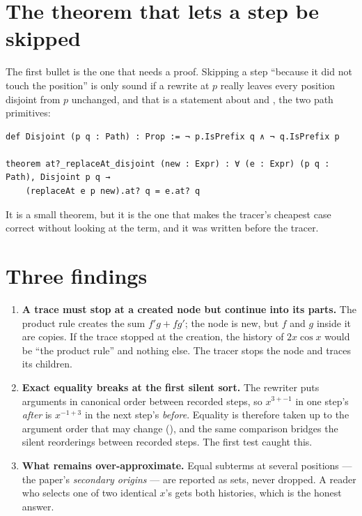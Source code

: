 \section{The theorem that lets a step be skipped}

The first bullet is the one that needs a proof. Skipping a step ``because it did not touch the
position'' is only sound if a rewrite at $p$ really leaves every position disjoint from $p$
unchanged, and that is a statement about  and , the two path primitives:

\begin{verbatim}
def Disjoint (p q : Path) : Prop := ¬ p.IsPrefix q ∧ ¬ q.IsPrefix p

theorem at?_replaceAt_disjoint (new : Expr) : ∀ (e : Expr) (p q : Path), Disjoint p q →
    (replaceAt e p new).at? q = e.at? q
\end{verbatim}

It is a small theorem, but it is the one that makes the tracer's cheapest case correct without
looking at the term, and it was written before the tracer.

\section{Three findings}

\begin{enumerate}[nosep]
  \item \textbf{A trace must stop at a created node but continue into its parts.} The product
    rule creates the sum $f'g + fg'$; the node is new, but $f$ and $g$ inside it are copies. If
    the trace stopped at the creation, the history of $2x \cos x$ would be ``the product rule''
    and nothing else. The tracer stops the node and traces its children.
  \item \textbf{Exact equality breaks at the first silent sort.} The rewriter puts arguments in
    canonical order between recorded steps, so $x^{3 + -1}$ in one step's \emph{after} is
    $x^{-1 + 3}$ in the next step's \emph{before}. Equality is therefore taken up to the argument
    order that  may change (), and the same comparison bridges the silent
    reorderings between recorded steps. The first test caught this.
  \item \textbf{What remains over-approximate.} Equal subterms at several positions --- the
    paper's \emph{secondary origins} --- are reported as sets, never dropped. A reader who selects
    one of two identical $x$'s gets both histories, which is the honest answer.
\end{enumerate}

